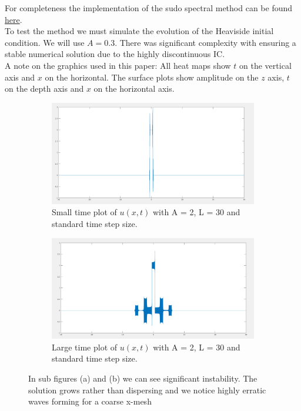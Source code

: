 \documentclass{article}
\begin{document}
For completeness the implementation of the sudo spectral method can be found \href{https://github.com/Liam-Watson/Analysis-of-mKdV-equation-with-Heaviside-IC/blob/main/a.m}{here}.\\
To test the method we must simulate the evolution of the Heaviside initial condition. We will use $A = 0.3$. There was significant complexity with ensuring a stable numerical solution due to the highly discontinuous IC. \\
A note on the graphics used in this paper: All heat maps show $t$ on the vertical axis and $x$ on the horizontal. The surface plots show amplitude on the $z$ axis, $t$ on the depth axis and $x$ on the horizontal axis.  
\begin{figure}[H]
\centering
\begin{subfigure}[b]{60mm}
\includegraphics[scale=0.1]{figures/smallTime.png}
\caption{Small time plot of $u(x,t)$ with A = 2, L = 30 and standard time step size. }
\label{fig:}
\end{subfigure}
\begin{subfigure}[b]{60mm}
\includegraphics[scale=0.1]{figures/bigTime.png}
\caption{Large time plot of $u(x,t)$ with A = 2, L = 30 and standard time step size.}
\label{fig:}
\end{subfigure}
\caption{In sub figures (a) and (b) we can see significant instability. The solution grows rather than dispersing and we notice highly erratic waves forming for a coarse x-mesh}
\label{fig:}
\end{figure} 
\end{document}
